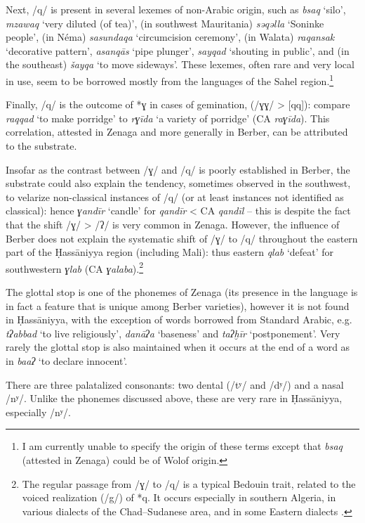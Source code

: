 \documentclass[output=paper]{langsci/langscibook}
\begin{document}
Next, /q/ is present in several lexemes of non-Arabic origin, such as \textit{bsaq} ‘silo’, \textit{mzaw{\R}aq} ‘very diluted (of tea)’, (in southwest Mauritania) \textit{sə{\R}qəlla} ‘Soninke people’, (in Néma) \textit{sasundaqa} ‘circumcision ceremony’, (in Walata) \textit{raqansak} ‘decorative pattern’, \textit{asanqās} ‘pipe plunger’, \textit{sayqad} ‘shouting in public’, and (in the southeast) \textit{šayqa} ‘to move sideways’. These lexemes, often rare and very local in use, seem to be borrowed mostly from the languages of the Sahel region.\footnote{I am currently unable to specify the origin of these terms except that \textit{bsaq} (attested in Zenaga) could be of Wolof origin.}

Finally, /q/ is the outcome of *ɣ in cases of gemination, (/ɣɣ/ > [qq]): compare \textit{raqqad} ‘to make porridge’ to \textit{rɣīda} ‘a variety of porridge’ (CA \textit{raɣīda}). This correlation, attested in Zenaga and more generally in Berber, can be attributed to the substrate.

Insofar as the contrast between /ɣ/ and /q/ is poorly established in Berber, the substrate could also explain the tendency, sometimes observed in the southwest, to velarize non-classical instances of /q/ (or at least instances not identified as classical): hence \textit{ɣandīr} ‘candle’ for \textit{qandīr} < CA \textit{qandīl} – this is despite the fact that the shift /ɣ/ > /ʔ/ is very common in Zenaga. However, the influence of Berber does not explain the systematic shift of /ɣ/ to /q/ throughout the eastern part of the Ḥassāniyya region (including Mali): thus eastern \textit{qlab} ‘defeat’ for southwestern \textit{ɣlab} (CA \textit{ɣalaba}).\footnote{The regular passage from /ɣ/ to /q/ is a typical Bedouin trait, related to the voiced realization (/g/) of *q. It occurs especially in southern Algeria, in various dialects of the Chad–Sudanese area, and in some Eastern dialects \citep[72]{Cantineau1960book}.}

The glottal stop is one of the phonemes of Zenaga (its presence in the language is in fact a feature that is unique among Berber varieties), however it is not found in Ḥassāniyya, with the exception of words borrowed from Standard Arabic, e.g. \textit{tʔabbad} ‘to live religiously’, \textit{danāʔa} ‘baseness’ and \textit{taʔḫīr} ‘postponement’. Very rarely the glottal stop is also maintained when it occurs at the end of a word as in \textit{ba{\R}{\R}aʔ} ‘to declare innocent’.

There are three palatalized consonants: two dental (/tʸ/ and /dʸ/) and a nasal /nʸ/. Unlike the phonemes discussed above, these are very rare in Ḥassāniyya, especially /nʸ/.
\end{document}
